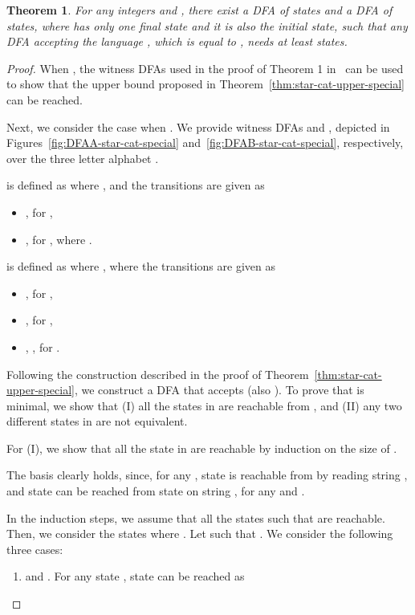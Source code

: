 \documentclass[10pt]{article}
\newtheorem{theorem}{Theorem}
\begin{document}
\begin{theorem}\label{thm:star-cat-lower-special}
For any integers  and , there exist a DFA  of  states and a DFA  of  states, where  has only one final state and it is also the initial state, such that any DFA accepting the language , which is equal to , needs at least  states.
\end{theorem}
\begin{proof}
When , the witness DFAs used in the proof of Theorem 1 in~\cite{YuZhSa94} can be used to show that the upper bound proposed in Theorem~\ref{thm:star-cat-upper-special} can be reached.

Next, we consider the case when .
We provide witness DFAs  and , depicted in Figures~\ref{fig:DFAA-star-cat-special} and~\ref{fig:DFAB-star-cat-special}, respectively, over the three letter alphabet .

 is defined as  where , and the transitions are given as
    \begin{itemize}
    \item , for ,
    \item , for , where .
    \end{itemize}

 is defined as  where , where the transitions are given as
    \begin{itemize}
    \item , for ,
    \item , for ,
    \item , , for .
    \end{itemize}

    Following the construction described in the proof of Theorem~\ref{thm:star-cat-upper-special}, we construct a DFA  that accepts  (also ).
    To prove that  is minimal, we show that (I) all the states in  are reachable from , and (II) any two different states in  are not equivalent.

    For (I), we show that all the state in  are reachable by induction on the size of .

    The basis clearly holds, since, for any , state  is reachable from  by reading string , and state  can be reached from state  on string , for any  and .

    In the induction steps, we assume that all the states  such that  are reachable.
    Then, we consider the states  where .
    Let  such that .
    We consider the following three cases:
    \begin{enumerate}
    \item  and .
    For any state , state  can be reached as
    

\end{enumerate}
\end{proof}
\end{document}

